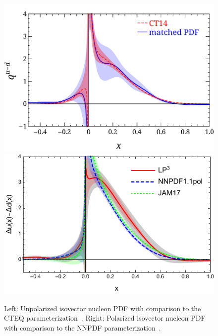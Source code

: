 \begin{figure}[h!]
	\centering
	\includegraphics[width=0.45\columnwidth]{figures/LP3-PDF-CT14}\hspace{1cm}
	\includegraphics[width=0.45\columnwidth]{figures/a09m130-helicity-comp}
	\caption{Left: Unpolarized isovector nucleon PDF with comparison to the CTEQ parameterization~\cite{Chen:2018xof}.
		Right: Polarized isovector nucleon PDF with comparison to the NNPDF parameterization~\cite{Lin:2018qky}.}
	\label{fig_quasipdf}
\end{figure}


